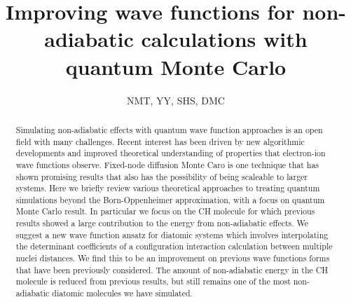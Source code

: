 \documentclass[aip,jcp,numerical,reprint]{revtex4-1}
\begin{document}
\title{Improving wave functions for non-adiabatic calculations with quantum Monte Carlo}
\author{NMT, YY, SHS, DMC}

\begin{abstract}
Simulating non-adiabatic effects with quantum wave function approaches is an open field with many challenges.  %
 Recent interest has been driven by new algorithmic developments and improved theoretical understanding of properties that electron-ion wave functions observe.  Fixed-node diffusion Monte Caro is one technique that has shown promising results that also has the possibility of being scaleable to larger systems.
 Here we briefly review various theoretical approaches to  treating quantum simulations beyond the Born-Oppenheimer approximation, with a focus on quantum Monte Carlo result.  In particular we focus on the CH molecule for which previous results showed a large contribution to the energy from non-adiabatic effects.  We suggest a new wave function ansatz for diatomic systems which involves interpolating the determinant coefficients of a configuration interaction calculation between multiple nuclei distances.   We find this to be an improvement on previous wave functions forms that have been previously considered.    The amount of non-adiabatic energy in the CH molecule is reduced from previous results, but still remains one of the most non-adiabatic  diatomic molecules we have simulated. 

\end{abstract}
\maketitle
\end{document}
